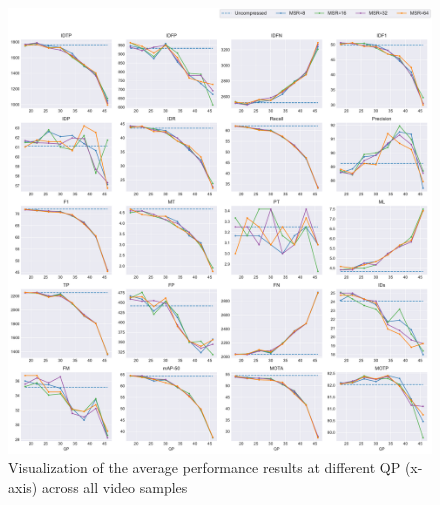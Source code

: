 \begin{figure}[!tb]
  \centering
  \includegraphics[width=1.0\linewidth]{img/averaged_all_multiplots_qp.pdf}
  \caption[Visualization of the average performance results at different QP (x-axis) of all video samples]
  {Visualization of the average performance results at different QP (x-axis) across all video samples}
  \label{fig:averaged_result_all_multiplots_qp}
\end{figure}